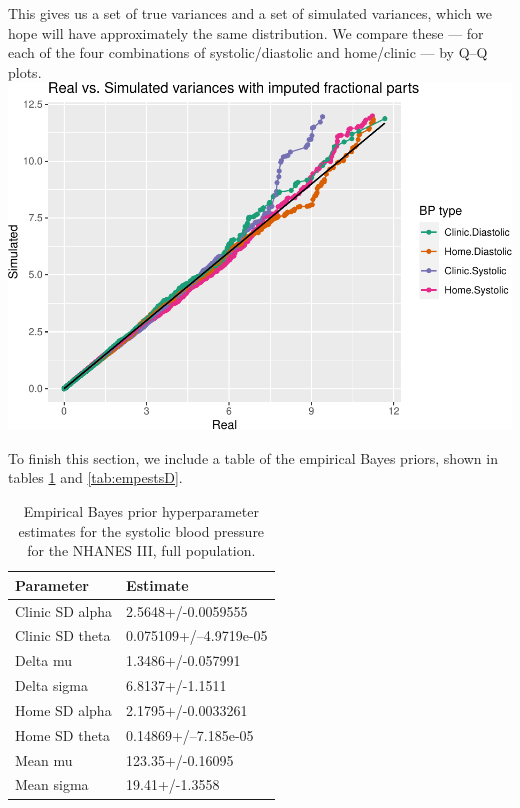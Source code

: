 \documentclass[
]{article}
\begin{document}
This gives us a set of true variances and a set of simulated variances, which we hope will have approximately the same distribution.
We compare these --- for each of the four combinations of systolic/diastolic and home/clinic --- by Q--Q plots.
\includegraphics{Appendix_files/figure-latex/Compare_variances-1.pdf}

To finish this section, we include a table of the empirical Bayes priors, shown in tables \ref{tab:empestsS} and \ref{tab:empestsD}.

\begin{table}

\caption{\label{tab:empestsS}Empirical Bayes prior hyperparameter estimates for the systolic blood pressure for the NHANES III, full population.}
\centering
\begin{tabular}[t]{ll}
\toprule
Parameter & Estimate\\
\midrule
Clinic SD alpha & 2.5648+/-0.0059555\\
Clinic SD theta & 0.075109+/--4.9719e-05\\
Delta mu & 1.3486+/-0.057991\\
Delta sigma & 6.8137+/-1.1511\\
Home SD alpha & 2.1795+/-0.0033261\\
\addlinespace
Home SD theta & 0.14869+/--7.185e-05\\
Mean mu & 123.35+/-0.16095\\
Mean sigma & 19.41+/-1.3558\\
\bottomrule
\end{tabular}
\end{table}
\end{document}
